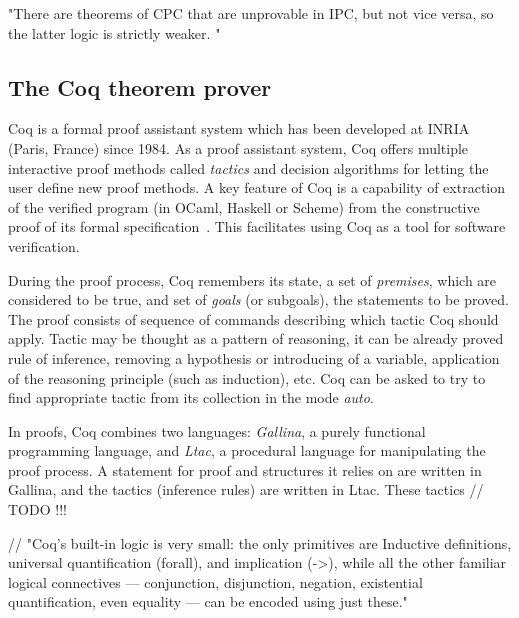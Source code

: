 \documentclass[article]{aaltoseries}
\begin{document}
"There are theorems of CPC that are unprovable in IPC, but not vice versa, so the latter logic is strictly weaker. "


\subsection{The Coq theorem prover}
\label{sec:prover_coq}

Coq is a formal proof assistant system which has been developed at INRIA (Paris, France) since 1984. As a proof assistant system, Coq offers multiple interactive proof methods called \textit{tactics} and decision algorithms for letting the user define new proof methods. A key feature of Coq is a capability of extraction of the verified program (in OCaml, Haskell or Scheme) from the constructive proof of its formal specification~\cite{tool_Coq}. This facilitates using Coq as a tool for software verification.

During the proof process, Coq remembers its state, a set of \textit{premises}, which are considered to be true, and set of \textit{goals} (or subgoals), the statements to be proved. The proof consists of sequence of commands describing which tactic Coq should apply. Tactic may be thought as a pattern of reasoning, it can be already proved rule of inference, removing a hypothesis or introducing of a variable, application of the reasoning principle (such as induction), etc. Coq can be asked to try to find appropriate tactic from its collection in the mode \textit{auto}.

In proofs, Coq combines two languages: \textit{Gallina}, a purely functional programming language, and \textit{Ltac}, a procedural language for manipulating the proof process. A statement for proof and structures it relies on are written in Gallina, and the tactics (inference rules) are written in Ltac. These tactics  // TODO !!! %


// "Coq's built-in logic is very small: the only primitives are Inductive definitions, universal quantification (forall), and implication (->), while all the other familiar logical connectives — conjunction, disjunction, negation, existential quantification, even equality — can be encoded using just these."
\end{document}
